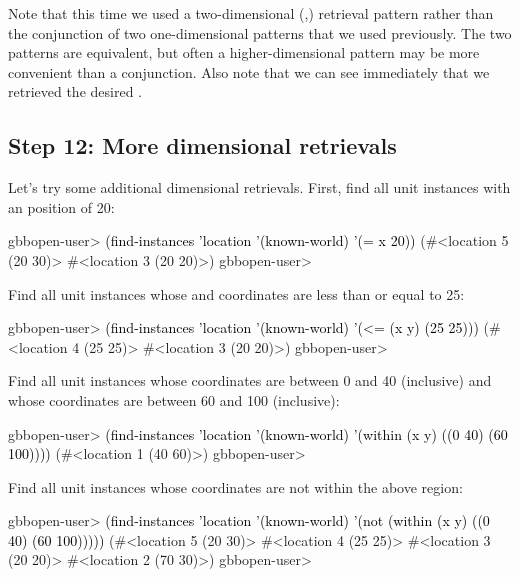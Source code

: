 \documentclass[10pt,twoside,english,pdftex]{article}
\begin{document}
Note that this time we used a two-dimensional (,) retrieval
pattern rather than the conjunction of two one-dimensional patterns that we
used previously.  The two patterns are equivalent, but often a
higher-dimensional pattern may be more convenient than a conjunction.  Also
note that we can see immediately that we retrieved the desired
.

\subsection*{Step 12: More dimensional retrievals}

%
%
Let's try some additional dimensional retrievals.  First, find all
 unit instances with an  position of 20:
%
\W\supp
\begin{example}
\textcolor{darkergray}{%
  gbbopen-user> \textcolor{black}{(find-instances 'location '(known-world)
                  '(= x 20))}
   (#<location 5 (20 30)> #<location 3 (20 20)>)
  gbbopen-user>}
\end{example}
%
Find all  unit instances whose  and 
coordinates are less than or equal to 25:
%
\W\supp\notpretop
\begin{example}
\textcolor{darkergray}{%
  gbbopen-user> \textcolor{black}{(find-instances 'location '(known-world)
                  '(<= (x y) (25 25)))}
  (#<location 4 (25 25)> #<location 3 (20 20)>)
  gbbopen-user>}
\end{example}
%
Find all  unit instances whose  coordinates are
between 0 and 40 (inclusive) and whose  coordinates are between 60 and
100 (inclusive):
%
\W\supp\notpretop
\begin{example}
\textcolor{darkergray}{%
  gbbopen-user> \textcolor{black}{(find-instances 'location '(known-world)
                  '(within (x y) ((0 40) (60 100))))}
  (#<location 1 (40 60)>)
  gbbopen-user>}
\end{example}
%
Find all  unit instances whose coordinates are not
within the above region:
%
\W\supp\notpretop
\begin{example}
\textcolor{darkergray}{%
  gbbopen-user> \textcolor{black}{(find-instances 'location '(known-world)
                  '(not (within (x y) ((0 40) (60 100)))))}
  (#<location 5 (20 30)> #<location 4 (25 25)> #<location 3 (20 20)>
   #<location 2 (70 30)>)
  gbbopen-user>}
\end{example}
\end{document}
